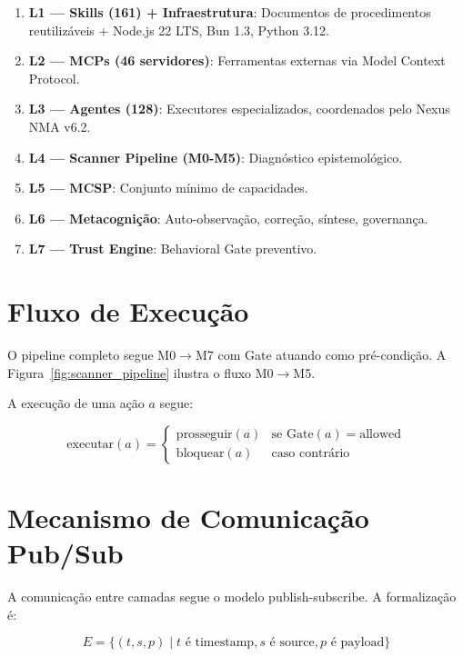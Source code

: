 \begin{enumerate}
    \item \textbf{L1 — Skills (161) + Infraestrutura}: Documentos de procedimentos reutilizáveis + Node.js 22 LTS, Bun 1.3, Python 3.12.
    \item \textbf{L2 — MCPs (46 servidores)}: Ferramentas externas via Model Context Protocol.
    \item \textbf{L3 — Agentes (128)}: Executores especializados, coordenados pelo Nexus NMA v6.2.
    \item \textbf{L4 — Scanner Pipeline (M0-M5)}: Diagnóstico epistemológico.
    \item \textbf{L5 — MCSP}: Conjunto mínimo de capacidades.
    \item \textbf{L6 — Metacognição}: Auto-observação, correção, síntese, governança.
    \item \textbf{L7 — Trust Engine}: Behavioral Gate preventivo.
\end{enumerate}

\section{Fluxo de Execução}

O pipeline completo segue M0$\rightarrow$M7 com Gate atuando como pré-condição. A Figura~\ref{fig:scanner_pipeline} ilustra o fluxo M0$\rightarrow$M5.

 A execução de uma ação $a$ segue:

\begin{equation}
\text{executar}(a) = \begin{cases}
\text{prosseguir}(a) & \text{se Gate}(a) = \text{allowed} \\
\text{bloquear}(a) & \text{caso contrário}
\end{cases}
\label{eq:gate_protocol}
\end{equation}

\section{Mecanismo de Comunicação Pub/Sub}

A comunicação entre camadas segue o modelo publish-subscribe. A formalização é:

\begin{equation}
E = \{(t, s, p) \mid t \text{ é timestamp}, s \text{ é source}, p \text{ é payload}\}
\label{eq:event_stream}
\end{equation}

